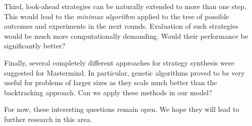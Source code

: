Third, look-ahead strategies can be naturally extended to more than one step.
This would lead to the \emph{minimax algorithm} applied to the tree of
  possible outcomes and experiments in the next rounds.
Evaluation of such strategies would be much more computationally demanding.
Would their performance be significantly better?

Finally, several completely different approaches for strategy synthesis
  were suggested for Mastermind.
In particular, genetic algorithms proved to be very useful for problems
  of larger sizes as they scale much better than the backtracking approach.
Can we apply these methods in our model?

For now, these interesting questions remain open.
We hope they will lead to further research in this area.
